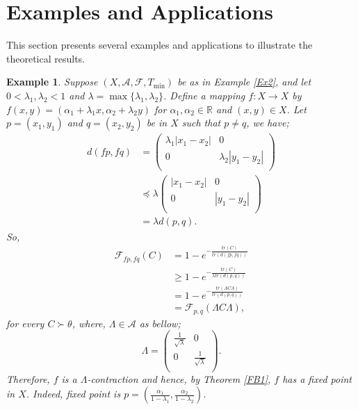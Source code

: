 \documentclass{amsart}%
\theoremstyle{plain}
\newtheorem{example}{Example}
\numberwithin{equation}{section}
\begin{document}
\section{Examples and Applications}
This section presents several examples and applications to illustrate the theoretical results.
\begin{example}
	Suppose $(X, \mathcal{A}, \mathcal{F}, T_{\min})$ be as in Example \ref{Ex2}, and let $0<\lambda_1, \lambda_2<1$ and $\lambda=\max\{\lambda_1, \lambda_2\}$. Define a mapping $f:X \to X$ by $f(x,y)=(\alpha_1+\lambda_1x, \alpha_2+\lambda_2y)$ for $\alpha_1, \alpha_2\in \mathbb{R}$ and $(x,y)\in X$. Let $p=(x_1,y_1)$ and $q=(x_2,y_2)$ be in $X$ such that $p\neq q$, we have;
	\begin{align*}
		d(fp,fq)&=\left(
		\begin{array}{cc}
			\lambda_1|x_1-x_2| & 0  \\
			0 & \lambda_2|y_1-y_2|  \\
		\end{array}
		\right)\\
		&\preceq \lambda \left(
		\begin{array}{cc}
			|x_1-x_2| & 0  \\
			0 & |y_1-y_2|  \\
		\end{array}
		\right)\\
		&=\lambda d(p,q).     		
	\end{align*} 
	So, 
	\begin{align*}
		\mathcal{F}_{fp,fq}(C)&=1-e^{-\frac{tr(C)}{tr\left( d(fp,fq)\right)}}\\
		&\geq 1-e^{-\frac{tr(C)}{\lambda tr\left( d(p,q)\right)}}\\
		&= 1-e^{-\frac{tr\left( \varLambda C\varLambda\right) }{tr\left( d(p,q)\right)}}\\
		&=\mathcal{F}_{p,q}\left( \varLambda C\varLambda\right),
	\end{align*}
	for every $C\succ \theta$, where, $\varLambda\in \mathcal{A}$ as bellow;
	$$\varLambda=\left(
	\begin{array}{cc}
		\frac{1}{\sqrt{\lambda}} & 0  \\
		0 & \frac{1}{\sqrt{\lambda}}  \\
	\end{array}
	\right).$$
	Therefore, $f$ is a $\varLambda$-contraction and  hence, by Theorem \ref{FB1}, $f$ has a fixed point in $X$. Indeed, fixed point is $p=\left(\frac{\alpha_1}{1-\lambda_1}, \frac{\alpha_2}{1-\lambda_2} \right)$.
\end{example}
\end{document}
